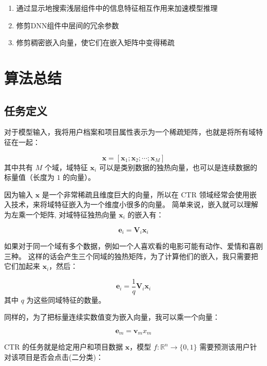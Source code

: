 \documentclass[degree=project,degree-type=project,cjk-font=noto]{thuthesis}
\begin{document}
\begin{enumerate}
  \item 通过显示地搜索浅层组件中的信息特征相互作用来加速模型推理
  \item 修剪DNN组件中层间的冗余参数
  \item 修剪稠密嵌入向量，使它们在嵌入矩阵中变得稀疏
\end{enumerate}


\chapter{算法总结}

\section{任务定义}

对于模型输入，我将用户档案和项目属性表示为一个稀疏矩阵，也就是将所有域特征在一起：

\begin{equation}
  \symbf{x} = [\symbf{x}_1; \symbf{x}_2; \cdots; \symbf{x}_M]
\end{equation}
其中共有 $M$ 个域，域特征 $\symbf{x}_i$ 可以是类别数据的独热向量，也可以是连续数据的标量值（长度为 $1$ 的向量）。

因为输入 $\bm{x}$ 是一个非常稀疏且维度巨大的向量，所以在 CTR 领域经常会使用嵌入技术，来将域特征嵌入为一个维度小很多的向量。
简单来说，嵌入就可以理解为左乘一个矩阵, 对域特征独热向量 $\bm{x}_i$ 的嵌入有：

\begin{equation}
  \bm{e}_i = \bm{V}_i \bm{x}_i
\end{equation}

如果对于同一个域有多个数据，例如一个人喜欢看的电影可能有动作、爱情和喜剧三种。
这样的话会产生三个同域的独热矩阵，为了计算他们的嵌入，我只需要把它们加起来 $\bm{x}_i$，然后：

\begin{equation}
  \bm{e}_i = \frac{1}{q} \bm{V}_i \bm{x}_i
\end{equation}
其中 $q$ 为这些同域特征的数量。

同样的，为了把标量连续实数值变为嵌入向量，我可以乘一个向量：

\begin{equation}
  \bm{e}_m = \bm{v}_m x_m
\end{equation}


CTR 的任务就是给定用户和项目数据 $\symbf{x}$，模型 $f: \mathbb{R}^n \rightarrow \{0, 1\}$ 需要预测该用户针对该项目是否会点击(二分类)：
\end{document}
